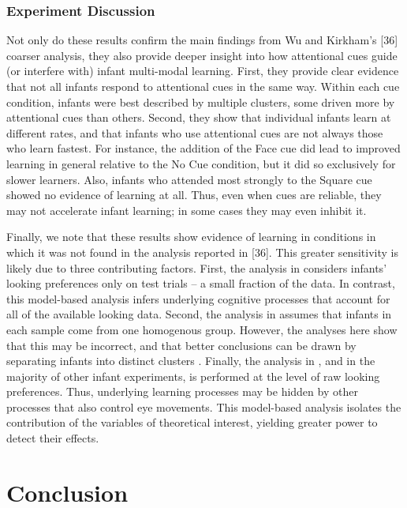 \documentclass[12pt]{article}
\begin{document}
\subsubsection*{Experiment Discussion}
	Not only do these results confirm the main findings from Wu and Kirkham's [36] coarser analysis, they also provide deeper insight into how attentional cues guide (or interfere with) infant multi-modal learning. First, they provide clear evidence that not all infants respond to attentional cues in the same way. Within each cue condition, infants were best described by multiple clusters, some driven more by attentional cues than others. Second, they show that individual infants learn at different rates, and that infants who use attentional cues are not always those who learn fastest. For instance, the addition of the Face cue did lead to improved learning in general relative to the No Cue condition, but it did so exclusively for slower learners. Also, infants who attended most strongly to the Square cue showed no evidence of learning at all. Thus, even when cues are reliable, they may not accelerate infant learning; in some cases they may even inhibit it. 

	Finally, we note that these results show evidence of learning in conditions in which it was not found in the analysis reported in [36]. This greater sensitivity is likely due to three contributing factors. First, the analysis in \cite{Wu2010a} considers infants' looking preferences only on test trials -- a small fraction of the data. In contrast, this model-based analysis infers underlying cognitive processes that account for all of the available looking data. Second, the analysis in \cite{Wu2010a} assumes that infants in each sample come from one homogenous group. However, the analyses here show that this may be incorrect, and that better conclusions can be drawn by separating infants into distinct clusters \cite{Estes1956, Gallistel2004, Siegler1987}. Finally, the analysis in \cite{Wu2010a}, and in the majority of other infant experiments, is performed at the level of raw looking preferences. Thus, underlying learning processes may be hidden by other processes that also control eye movements. This model-based analysis isolates the contribution of the variables of theoretical interest, yielding greater power to detect their effects.

\section*{Conclusion}
	
\end{document}
